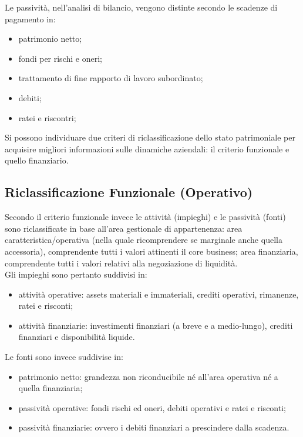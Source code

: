 Le passività, nell’analisi di bilancio, vengono distinte secondo le scadenze di pagamento in:
\begin{itemize}
 \item patrimonio netto;
 \item fondi per rischi e oneri;
 \item trattamento di fine rapporto di lavoro subordinato;
 \item debiti;
 \item ratei e riscontri;
\end{itemize}

Si possono individuare due criteri di riclassificazione dello stato patrimoniale per acquisire migliori informazioni sulle dinamiche aziendali: il criterio funzionale e quello finanziario.


\subsection{Riclassificazione Funzionale (Operativo)}

Secondo il criterio funzionale invece le attività (impieghi) e le passività (fonti) sono riclassificate in base all’area gestionale di appartenenza: area caratteristica/operativa (nella quale ricomprendere se marginale anche quella accessoria), comprendente tutti i valori attinenti il core business; area finanziaria, comprendente tutti i valori relativi alla negoziazione di liquidità.\\
Gli impieghi sono pertanto suddivisi in:
\begin{itemize}
\item attività operative: assets materiali e immateriali, crediti operativi, rimanenze, ratei e risconti;
\item attività finanziarie: investimenti finanziari (a breve e a medio-lungo), crediti finanziari e disponibilità liquide.
\end{itemize}

Le fonti sono invece suddivise in:
\begin{itemize}
\item patrimonio netto: grandezza non riconducibile né all’area operativa né a quella finanziaria;
\item passività operative: fondi rischi ed oneri, debiti operativi e ratei e risconti;
\item passività finanziarie: ovvero i debiti finanziari a prescindere dalla scadenza.
\end{itemize}

